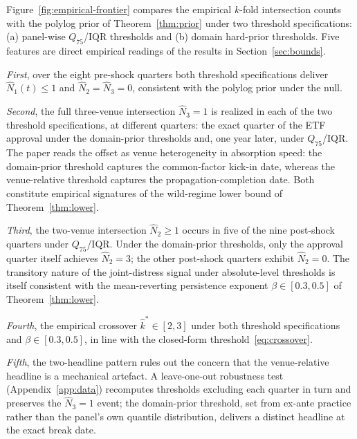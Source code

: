 Figure~\ref{fig:empirical-frontier} compares the empirical
$k$-fold intersection counts with the polylog prior of
Theorem~\ref{thm:prior} under two threshold specifications: (a)
panel-wise $Q_{75}$/IQR thresholds and (b) domain hard-prior
thresholds. Five features are direct empirical readings of the
results in Section~\ref{sec:bounds}.

\emph{First}, over the eight pre-shock quarters both threshold
specifications deliver $\hat N_1(t) \le 1$ and $\hat N_2 = \hat N_3
= 0$, consistent with the polylog prior under the null.

\emph{Second}, the full three-venue intersection $\hat N_3 = 1$ is
realized in each of the two threshold specifications, at different
quarters: the exact quarter of the ETF approval under the
domain-prior thresholds and, one year later, under $Q_{75}$/IQR.
The paper reads the offset as venue heterogeneity in absorption
speed: the domain-prior threshold captures the common-factor
kick-in date, whereas the venue-relative threshold captures the
propagation-completion date. Both constitute empirical signatures
of the wild-regime lower bound of Theorem~\ref{thm:lower}.

\emph{Third}, the two-venue intersection $\hat N_2 \ge 1$ occurs in
five of the nine post-shock quarters under $Q_{75}$/IQR. Under the
domain-prior thresholds, only the approval quarter itself achieves
$\hat N_2 = 3$; the other post-shock quarters exhibit
$\hat N_2 = 0$. The transitory nature of the joint-distress signal
under absolute-level thresholds is itself consistent with the
mean-reverting persistence exponent $\beta \in [0.3, 0.5]$ of
Theorem~\ref{thm:lower}.

\emph{Fourth}, the empirical crossover $\hat k^\ast \in [2,3]$
under both threshold specifications and $\beta \in [0.3, 0.5]$, in
line with the closed-form threshold~\eqref{eq:crossover}.

\emph{Fifth}, the two-headline pattern rules out the concern that
the venue-relative headline is a mechanical artefact. A
leave-one-out robustness test (Appendix~\ref{app:data}) recomputes
thresholds excluding each quarter in turn and preserves the
$\hat N_3 = 1$ event; the domain-prior threshold, set from ex-ante
practice rather than the panel's own quantile distribution,
delivers a distinct headline at the exact break date.

